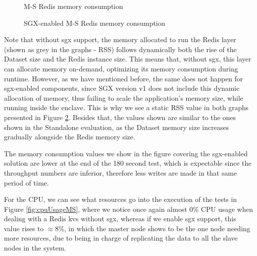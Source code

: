 \begin{figure}[htbp]
	\centering
	\caption{M-S Redis memory consumption}
	\label{fig:noSgxMemoryConsumption}
\end{figure}

\begin{figure}[htbp]
	\centering
	\caption{SGX-enabled M-S Redis memory consumption}
	\label{fig:sgxMemoryConsumption}
\end{figure}

Note that without \gls{sgx} support, the memory allocated to run the Redis layer (shown as grey in the graphs - RSS) follows dynamically both the rise of the Dataset size and the Redis instance size. This means that, without \gls{sgx}, this layer can allocate memory on-demand, optimizing its memory consumption during runtime. However, as we have mentioned before, the same does not happen for \gls{sgx}-enabled components, since SGX version v1 does not include this dynamic allocation of memory, thus failing to scale the application's memory size, while running inside the enclave. This is why we see a static RSS value in both graphs presented in Figure \ref{fig:sgxMemoryConsumption}. Besides that, the values shown are similar to the ones shown in the Standalone evaluation, as the Dataset memory size increases gradually alongside the Redis memory size.

The memory consumption values we show in the figure covering the \gls{sgx}-enabled solution are lower at the end of the 180 second test, which is expectable since the throughput numbers are inferior, therefore less writes are made in that same period of time. 

For the CPU, we can see what resources go into the execution of the tests in Figure \ref{fig:cpuUsageMS}, where we notice once again almost 0\% CPU usage when dealing with a Redis \gls{kvs} without \gls{sgx}, whereas if we enable \gls{sgx} support, this value rises to $\approx$8\%, in which the master node shows to be the one node needing more resources, due to being in charge of replicating the data to all the slave nodes in the system.

